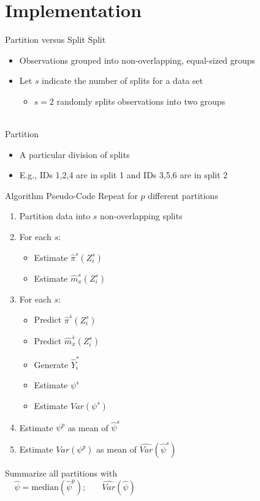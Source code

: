\documentclass{beamer}
\begin{document}
\section{Implementation}

\begin{frame}{Partition versus Split}
	Split
	\begin{itemize}
		\item Observations grouped into non-overlapping, equal-sized groups
		\item Let $s$ indicate the number of splits for a data set
		\begin{itemize}
			\item $s=2$ randomly splits observations into two groups
		\end{itemize}
	\end{itemize}~\\
	Partition
	\begin{itemize}
		\item A particular division of splits
		\item E.g., IDs 1,2,4 are in split 1 and IDs 3,5,6 are in split 2		
	\end{itemize}
\end{frame}

\begin{frame}{Algorithm Pseudo-Code}
	Repeat for $p$ different partitions
	\begin{enumerate}
		\item Partition data into $s$ non-overlapping splits
		\item For each $s$:
		\begin{itemize}
			\item Estimate $\hat{\pi}^s(Z_i^s)$
			\item Estimate $\hat{m}_x^s(Z_i^s)$
		\end{itemize}
		\item For each $s$:
		\begin{itemize}
			\item Predict $\hat{\pi}^{\bar{s}} (Z_i^s)$
			\item Predict $\hat{m}_x^{\bar{s}}(Z_i^s)$
			\item Generate $\hat{Y}_i^*$
			\item Estimate $\psi^s$
			\item Estimate $Var(\psi^s)$
		\end{itemize}
		\item Estimate $\psi^p$ as mean of $\hat{\psi}^s$
		\item Estimate $Var(\psi^p)$ as mean of $\widehat{Var}(\hat{\psi}^s)$
	\end{enumerate}
	Summarize all partitions with~\\ 
	$\;\;\;\; \hat{\psi} = \text{median}(\hat{\psi}^p)\text{;} \;\;\;\;\;\;\; \widehat{Var}(\hat{\psi})$
\end{frame}
\end{document}
